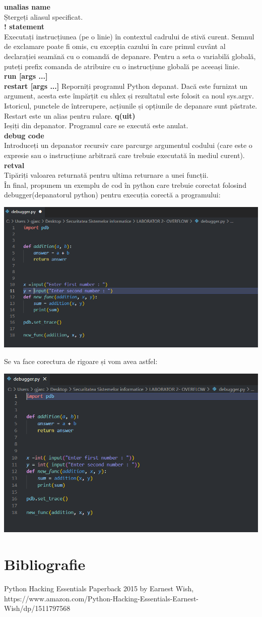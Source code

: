 \documentclass[oneside,20pt]{article}          %
\begin{document}
\textbf{unalias name}\\
Ștergeți aliasul specificat.\\

\textbf{! statement}\\
Executați instrucțiunea (pe o linie) în contextul cadrului de stivă curent. Semnul de exclamare poate fi omis, cu excepția cazului în care primul cuvânt al declarației seamănă cu o comandă de depanare. Pentru a seta o variabilă globală, puteți prefix comanda de atribuire cu o instrucțiune globală pe aceeași linie.\\
\textbf{run [args ...]}\\
\textbf{restart [args ...]}
Reporniți programul Python depanat. Dacă este furnizat un argument, acesta este împărțit cu shlex și rezultatul este folosit ca noul sys.argv. Istoricul, punctele de întrerupere, acțiunile și opțiunile de depanare sunt păstrate. Restart este un alias pentru rulare.
\textbf{
q(uit)}\\
Ieșiți din depanator. Programul care se execută este anulat.\\

\textbf{debug code}\\
Introduceți un depanator recursiv care parcurge argumentul codului (care este o expresie sau o instrucțiune arbitrară care trebuie executată în mediul curent).\\

\textbf{retval}\\
Tipăriți valoarea returnată pentru ultima returnare a unei funcții.\\

În final, propunem un exemplu de cod în python care trebuie corectat folosind debugger(depanatorul python) pentru execuția corectă a programului:
\begin{center}
\includegraphics[height = 5 cm]{6.png}
\end{center}
Se va face corectura de rigoare și vom avea astfel:

\begin{center}
\includegraphics[height = 5 cm]{7.png}
\end{center}

\section{Bibliografie}

Python Hacking Essentials Paperback 2015 by Earnest Wish, \\
https://www.amazon.com/Python-Hacking-Essentials-Earnest-Wish/dp/1511797568
\end{document}
